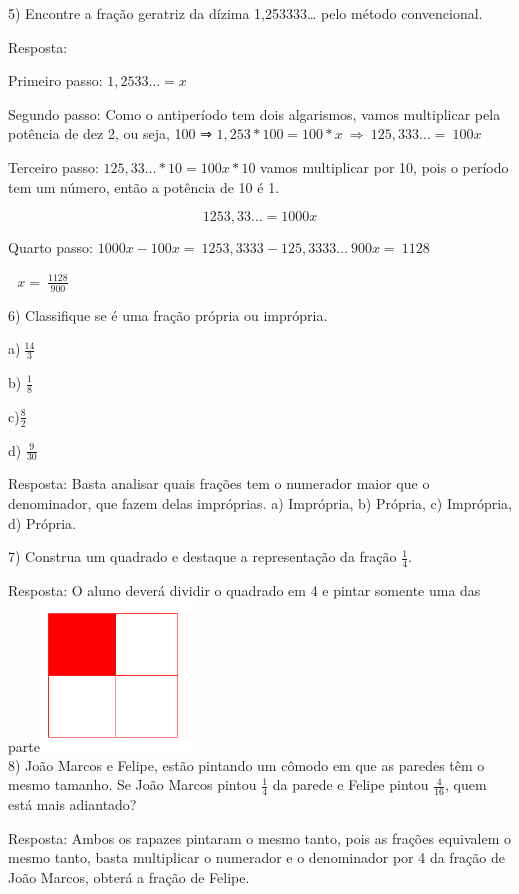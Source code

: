 5) Encontre a fração geratriz da dízima 1,253333\ldots{} pelo método
convencional.

Resposta:

Primeiro passo: \(1,2533\ldots = x\)

Segundo passo: Como o antiperíodo tem dois algarismos, vamos multiplicar
pela potência de dez 2, ou seja, 100 ⇒
\(1,253*100 = 100*x\  \Rightarrow \ 125,333\ldots = \ 100x\)

Terceiro passo: \(125,33\ldots*10 = 100x*10\) vamos multiplicar por 10,
pois o período tem um número, então a potência de 10 é 1.

\[1253,33\ldots = 1000x\]

Quarto passo:
\(1000x - 100x = \ 1253,3333 - 125,3333\ldots\ 900x = \ 1128\)

\(\text{\ \ \ \ \ \ \ \ \ \ \ \ \ \ \ \ \ \ \ \ \ \ \ \ \ \ \ \ \ \ \ \ \ \ \ \ \ \ \ \ \ \ \ \ \ \ \ \ \ \ \ \ \ \ }x = \ \frac{1128}{900}\)

6) Classifique se é uma fração própria ou imprópria.

a)\(\ \frac{14}{3}\)

b) \(\frac{1}{8}\)

c)\(\frac{8}{2}\)

d) \(\frac{9}{30}\)

Resposta: Basta analisar quais frações tem o numerador maior que o
denominador, que fazem delas impróprias. a) Imprópria, b) Própria, c)
Imprópria, d) Própria.

7) Construa um quadrado e destaque a representação da fração
\(\frac{1}{4}\).

Resposta: O aluno deverá dividir o quadrado em 4 e pintar somente uma
das
parte\includegraphics[width=1.60536in,height=1.56845in]{./imgSAEB_7_MAT/media/image9.png}\\
8) João Marcos e Felipe, estão pintando um cômodo em que as paredes têm
o mesmo tamanho. Se João Marcos pintou \(\frac{1}{4}\) da parede e
Felipe pintou \(\frac{4}{16}\), quem está mais adiantado?

Resposta: Ambos os rapazes pintaram o mesmo tanto, pois as frações
equivalem o mesmo tanto, basta multiplicar o numerador e o denominador
por 4 da fração de João Marcos, obterá a fração de Felipe.

